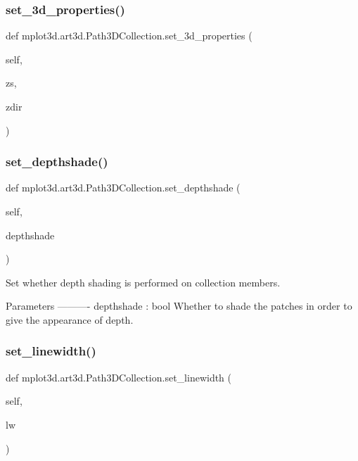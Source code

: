 \subsubsection{\texorpdfstring{set\+\_\+3d\+\_\+properties()}{set\_3d\_properties()}}
{\footnotesize\ttfamily def mplot3d.\+art3d.\+Path3\+D\+Collection.\+set\+\_\+3d\+\_\+properties (\begin{DoxyParamCaption}\item[{}]{self,  }\item[{}]{zs,  }\item[{}]{zdir }\end{DoxyParamCaption})}

\mbox{\label{classmplot3d_1_1art3d_1_1Path3DCollection_a68980b4192c872e0623d18b1436ab50f}} 
\subsubsection{\texorpdfstring{set\+\_\+depthshade()}{set\_depthshade()}}
{\footnotesize\ttfamily def mplot3d.\+art3d.\+Path3\+D\+Collection.\+set\+\_\+depthshade (\begin{DoxyParamCaption}\item[{}]{self,  }\item[{}]{depthshade }\end{DoxyParamCaption})}

\begin{DoxyVerb}Set whether depth shading is performed on collection members.

Parameters
----------
depthshade : bool
    Whether to shade the patches in order to give the appearance of
    depth.
\end{DoxyVerb}
 \mbox{\label{classmplot3d_1_1art3d_1_1Path3DCollection_a75a92ddaef2db7d8b0128c3e73ac6e18}} 
\subsubsection{\texorpdfstring{set\+\_\+linewidth()}{set\_linewidth()}}
{\footnotesize\ttfamily def mplot3d.\+art3d.\+Path3\+D\+Collection.\+set\+\_\+linewidth (\begin{DoxyParamCaption}\item[{}]{self,  }\item[{}]{lw }\end{DoxyParamCaption})}

